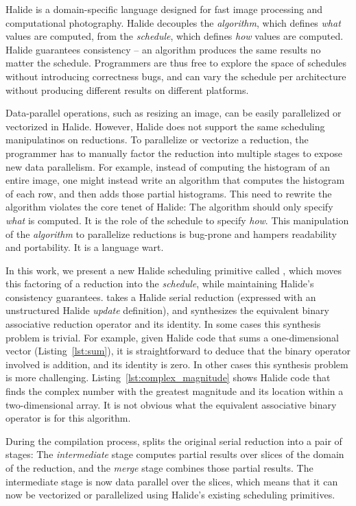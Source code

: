Halide \cite{Ragan-Kelley:2013:HLC:2491956.2462176} is a domain-specific language designed for fast image processing and computational photography. Halide decouples the \emph{algorithm}, which defines \emph{what} values are computed, from the \emph{schedule}, which defines \emph{how} values are computed. Halide guarantees consistency -- an algorithm produces the same results no matter the schedule. Programmers are thus free to explore the space of schedules without introducing correctness bugs, and can vary the schedule per architecture without producing different results on different platforms.

Data-parallel operations, such as resizing an image, can be easily parallelized or vectorized in Halide. However, Halide does not support the same scheduling manipulatinos on reductions. To parallelize or vectorize a reduction, the programmer has to manually factor the reduction into multiple stages to expose new data parallelism. For example, instead of computing the histogram of an entire image, one might instead write an algorithm that computes the histogram of each row, and then adds those partial histograms. This need to rewrite the algorithm violates the core tenet of Halide: The algorithm should only specify \emph{what} is computed. It is the role of the schedule to specify \emph{how}. This manipulation of the \emph{algorithm} to parallelize reductions is bug-prone and hampers readability and portability. It is a language wart.

In this work, we present a new Halide scheduling primitive called , which moves this factoring of a reduction into the \emph{schedule}, while maintaining Halide's consistency guarantees.  takes a Halide serial reduction (expressed with an unstructured Halide \emph{update} definition), and synthesizes the equivalent binary associative reduction operator and its identity. In some cases this synthesis problem is trivial. For example, given Halide code that sums a one-dimensional vector (Listing~\ref{lst:sum}), it is straightforward to deduce that the binary operator involved is addition, and its identity is zero. In other cases this synthesis problem is more challenging. Listing~\ref{lst:complex_magnitude} shows Halide code that finds the complex number with the greatest magnitude and its location within a two-dimensional array. It is not obvious what the equivalent associative binary operator is for this algorithm.

During the compilation process,  splits the original serial reduction into a pair of stages: The \emph{intermediate} stage computes partial results over slices of the domain of the reduction, and the \emph{merge} stage combines those partial results. The intermediate stage is now data parallel over the slices, which means that it can now be vectorized or parallelized using Halide's existing scheduling primitives.

